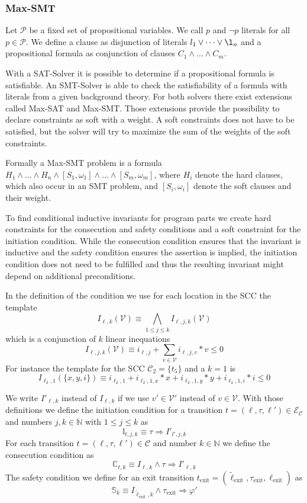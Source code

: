 \subsubsection{Max-SMT}

Let $\mathcal{P}$ be a fixed set of propositional variables.
We call $p$ and $\neg p$ literals for all $p \in \mathcal{P}$.
We define a clause as disjunction of literals $l_1 \vee \dots \vee \l_n$ and a propositional formula as conjunction of clauses $C_1 \wedge \dots \wedge C_m$.

With a SAT-Solver it is possible to determine if a propositional formula is satisfiable.
An SMT-Solver is able to check the satisfiability of a formula with literals from a given background theory.
For both solvers there exist extensions called Max-SAT and Max-SMT.
Those extensions provide the possibility to declare constraints as soft with a weight.
A soft constraints does not have to be satisfied, but the solver will try to maximize the sum of the weights of the soft constraints.

Formally a Max-SMT problem is a formula $H_1 \wedge \dots \wedge H_n \wedge [S_1,\omega_1] \wedge \dots \wedge [S_m,\omega_m]$, where $H_i$ denote the hard clauses, which also occur in an SMT problem, and $[S_i,\omega_i]$ denote the soft clauses and their weight.

To find conditional inductive invariants for program parts we create hard constraints for the consecution and safety conditions and a soft constraint for the initiation condition.
While the consecution condition ensures that the invariant is inductive and the safety condition ensures the assertion is implied, the initiation condition does not need to be fulfilled and thus the resulting invariant might depend on additional preconditions.  

In the definition of the condition we use for each location in the SCC the template \[ I_{\ell,k}(\mathcal{V}) \equiv \bigwedge_{1 \leq j \leq k}{I_{\ell,j,k}(\mathcal{V})} \] which is a conjunction of $k$ linear inequations \[ I_{\ell,j,k}(\mathcal{V}) \equiv i_{\ell,j} + \sum_{v \in \mathcal{V}}{i_{\ell,j,v} * v} \leq 0 \]
For instance the template for the SCC $\mathcal{C}_2 = \lbrace t_5 \rbrace$ and a $k=1$ is \[ I_{\ell_2,1}(\lbrace x, y, i \rbrace) \equiv i_{\ell_2,1} + i_{\ell_2,1,x} * x + i_{\ell_2,1,y} * y + i_{\ell_2,1,i} * i \leq 0 \]

We write $I'_{\ell,k}$ instead of $I_{\ell,k}$ if we use $v' \in \mathcal{V}'$ instead of $v \in \mathcal{V}$.
With those definitions we define the initiation condition for a transition $t = (\ell, \tau, \ell') \in \mathcal{E}_\mathcal{C}$ and numbers $j, k \in \mathbb{N}$ with $1 \leq j \leq k$ as \[ \mathbb{I}_{t,j,k} \equiv \tau \Rightarrow I'_{l',j,k} \]
For each transition $t = (\ell, \tau, \ell') \in \mathcal{C}$ and number $k \in \mathbb{N}$ we define the consecution condition as \[ \mathbb{C}_{t,k} \equiv I_{\ell,k} \wedge \tau \Rightarrow I'_{\ell,k} \]
The safety condition we define for an exit transition $t_\text{exit} = (\tilde{\ell}_\text{exit}, \tau_\text{exit}, \ell_\text{exit})$ as \[ \mathbb{S}_k \equiv I_{\tilde{\ell}_\text{exit},k} \wedge \tau_\text{exit} \Rightarrow \varphi' \]

